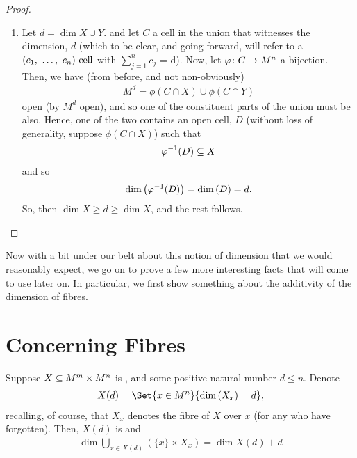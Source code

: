 \begin{proof}
\begin{enumerate}
    \item Let $d = \dim{X \cup Y}$. and let $C$ a cell in the union that witnesses the dimension, $d$ (which to be clear, and going forward, will refer to a $(c_1, \ \hdots, \ c_{n})\textrm{-cell}$ with $\sum_{j=1}^{n} c_j$ = d). Now, let $\varphi \colon C \to M^n$ a  bijection. Then, we have (from before, and not non-obviously)
        \begin{align*}
          M^d = \phi(C \cap X) \cup \phi(C \cap Y)
        \end{align*}
        open (by $M^d$ open), and so one of the constituent parts of the union must be also. Hence, one of the two contains an open cell, $D$ (without loss of generality, suppose $\phi(C \cap X)$) such that 
        \begin{align*}
          \varphi^{-1}(D) \subseteq X
        \end{align*}
        and so
        \begin{align*}
          \operatorname{dim}\left(\varphi^{-1}(D)\right) = \operatorname{dim}\left(D\right) = d.
        \end{align*}
        So, then $\dim{X} \geq d \geq \dim{X}$, and the rest follows.
  \end{enumerate}
\end{proof}

Now with a bit under our belt about this notion of dimension that we would reasonably expect, we go on to prove a few more interesting facts that will come to use later on. In particular, we first show something about the additivity of the dimension of fibres.

\section{Concerning Fibres}

\begin{proposition}
  \label{prop:fibre_add}
  Suppose $X \subseteq M^m \times M^n$ is , and some positive natural number $d \leq n$. Denote
  \begin{align*}
    X(d) = \Set{x \in M^n}{\dim{X_x} = d},
  \end{align*}
  recalling, of course, that $X_x$ denotes the fibre of $X$ over $x$ (for any who have forgotten). Then, $X(d)$ is  and
  \begin{align*}
    \dim{ \bigcup_{x \in X(d)} \left( \{x\} \times X_x \right) } = \dim{X(d)} + d
  \end{align*}
\end{proposition}


